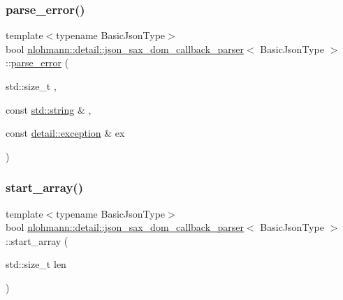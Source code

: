 \mbox{\label{classnlohmann_1_1detail_1_1json__sax__dom__callback__parser_aac6e64f0b59c9150cde974e182d5ecab}} 
\subsubsection{\texorpdfstring{parse\_error()}{parse\_error()}}
{\footnotesize\ttfamily template$<$typename Basic\+Json\+Type$>$ \\
bool \mbox{\hyperlink{classnlohmann_1_1detail_1_1json__sax__dom__callback__parser}{nlohmann\+::detail\+::json\+\_\+sax\+\_\+dom\+\_\+callback\+\_\+parser}}$<$ Basic\+Json\+Type $>$\+::\mbox{\hyperlink{classnlohmann_1_1detail_1_1parse__error}{parse\+\_\+error}} (\begin{DoxyParamCaption}\item[{std\+::size\+\_\+t}]{,  }\item[{const \mbox{\hyperlink{namespacenlohmann_1_1detail_a1ed8fc6239da25abcaf681d30ace4985ab45cffe084dd3d20d928bee85e7b0f21}{std\+::string}} \&}]{,  }\item[{const \mbox{\hyperlink{classnlohmann_1_1detail_1_1exception}{detail\+::exception}} \&}]{ex }\end{DoxyParamCaption})\hspace{0.3cm}{\ttfamily [inline]}}

\mbox{\label{classnlohmann_1_1detail_1_1json__sax__dom__callback__parser_a5255b98ba8282e3625968f91cff9d3d0}} 
\subsubsection{\texorpdfstring{start\_array()}{start\_array()}}
{\footnotesize\ttfamily template$<$typename Basic\+Json\+Type$>$ \\
bool \mbox{\hyperlink{classnlohmann_1_1detail_1_1json__sax__dom__callback__parser}{nlohmann\+::detail\+::json\+\_\+sax\+\_\+dom\+\_\+callback\+\_\+parser}}$<$ Basic\+Json\+Type $>$\+::start\+\_\+array (\begin{DoxyParamCaption}\item[{std\+::size\+\_\+t}]{len }\end{DoxyParamCaption})\hspace{0.3cm}{\ttfamily [inline]}}

